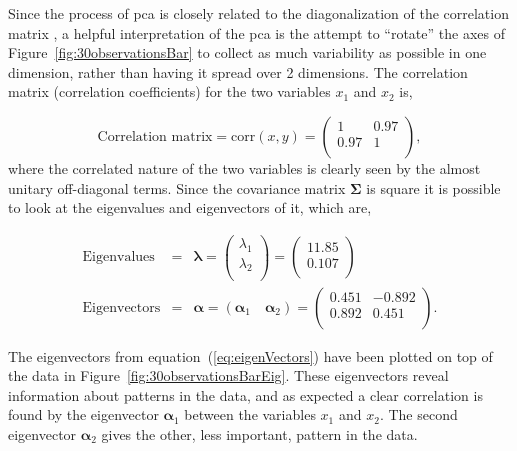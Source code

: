 Since the process of \gls{pca} is closely related to the diagonalization of the correlation matrix \citep[p. 174]{Therrien1992}, a helpful interpretation of the \gls{pca} is the attempt to ``rotate'' the axes of Figure~\ref{fig:30observationsBar} to collect as much variability as possible in one dimension, rather than having it spread over 2 dimensions. The correlation matrix (correlation coefficients) for the two variables $x_1$ and $x_2$ is,

\begin{equation}\label{eq:corrcoef}
\textrm{Correlation matrix} = \textrm{corr}(x,y)= \left(
    \begin{array}{cc}
        1   & 0.97 \\
        0.97& 1    \\
    \end{array}\right),
\end{equation}
where the correlated nature of the two variables is clearly seen by the almost unitary off-diagonal terms. Since the covariance matrix $\boldsymbol\Sigma$ is square it is possible to look at the eigenvalues and eigenvectors of it, which are,

\begin{eqnarray}\label{eq:eigValues}
\textrm{Eigenvalues} &=& \boldsymbol\lambda = \left(
    \begin{array}{c}
        \lambda_1 \\
        \lambda_2 \\
    \end{array}\right) = \left(
    \begin{array}{c}
        11.85 \\
        0.107 \\
    \end{array}\right)\\\label{eq:eigenVectors}
    \textrm{Eigenvectors} &=& \boldsymbol\alpha = \left( \boldsymbol\alpha_1 \quad \boldsymbol\alpha_2\right) =\left(
    \begin{array}{cc}
         0.451 & -0.892  \\
         0.892 & 0.451   \\
    \end{array}\right).
\end{eqnarray}

The eigenvectors from equation~(\ref{eq:eigenVectors}) have been plotted on top of the data in Figure~\ref{fig:30observationsBarEig}. These eigenvectors reveal information about patterns in the data, and as expected a clear correlation is found by the eigenvector $\boldsymbol\alpha_1$ between the variables $x_1$ and $x_2$. The second eigenvector $\boldsymbol\alpha_2$ gives the other, less important, pattern in the data.

